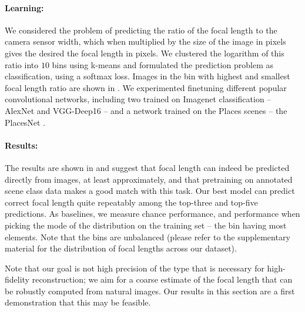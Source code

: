\paragraph{Learning:} We considered the problem of predicting the ratio of the focal length to the camera sensor width, which when multiplied by the size of the image in pixels gives the desired the focal length in pixels. We clustered the logarithm of this ratio into $10$ bins using k-means and formulated the prediction problem as classification, using a softmax loss. Images in the bin with highest and smallest focal length ratio are shown in . We experimented finetuning different popular convolutional networks, including two trained on Imagenet classification -- AlexNet \cite{krizhevsky2012imagenet} and VGG-Deep16 \cite{simonyan2014very} -- and a network trained on the Places scenes -- the PlacesNet \cite{zhou2014learning}.

\paragraph{Results:} The results are shown in  and suggest that focal length can indeed be predicted directly from images, at least approximately, and that pretraining on annotated scene class data makes a good match with this task. Our best model can predict correct focal length quite repeatably  among the top-three and top-five predictions. As baselines, we measure chance performance, and performance when picking the mode of the distribution on the training set -- the bin having most elements. Note that the bins are unbalanced (please refer to the supplementary material for the distribution of focal lengths across our dataset).

Note that our goal is not high precision of the type that is necessary for high-fidelity reconstruction; we aim for a coarse estimate of the focal length that can be robustly computed from natural images. Our results in this section are a first demonstration that this may be feasible.

\renewcommand{\arraystretch}{1.4}
\begin{table}
\centering
{}
    \caption{Focal length misclassification rate (top-1, top-3 and top-5 predictions) of networks pretrained on object images from Imagenet and the Places dataset. Lower is better.}
\end{table}




